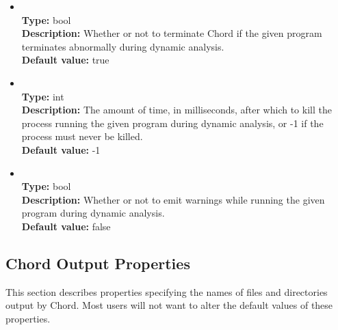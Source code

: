\begin{itemize}
\item
{} \\
{\bf Type:} bool \\
{\bf Description:} Whether or not to terminate Chord if the given program terminates abnormally during dynamic analysis. \\
{\bf Default value:} true

\item
{} \\
{\bf Type:} int \\
{\bf Description:} The amount of time, in milliseconds, after which to kill the process running the given program during dynamic analysis, or -1 if the process must never be killed. \\
{\bf Default value:} -1

\item
{} \\
{\bf Type:} bool \\
{\bf Description:} Whether or not to emit warnings while running the given program during dynamic analysis. \\
{\bf Default value:} false
\end{itemize}

\subsection{Chord Output Properties}

This section describes properties specifying the names of files and directories output by Chord.
Most users will not want to alter the default values of these properties.

